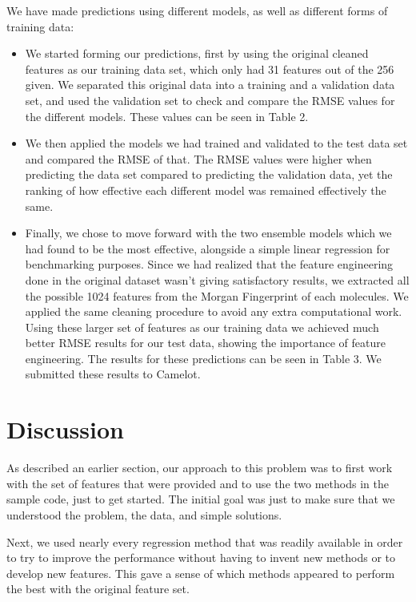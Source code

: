 \documentclass[11pt]{article}
\begin{document}
We have made predictions using different models, as well as different forms of training data: 

  \begin{itemize}

\item We started forming our predictions, first by using the original cleaned features as our training data set, which only had 31 features out of the 256 given. We separated this original data into a training and a validation data set, and used the validation set to check and compare the RMSE values for the different models. These values can be seen in Table 2. 

\item We then applied the models we had trained and validated to the test data set and compared the RMSE of that. The RMSE values were higher when predicting the data set compared to predicting the validation data, yet the ranking of how effective each different model was remained effectively the same. 

\item Finally, we chose to move forward with the two ensemble models which we had found to be the most effective, alongside a simple linear regression for benchmarking purposes. Since we had realized that the feature engineering done in the original dataset wasn't giving satisfactory results, we extracted all the possible 1024 features from the Morgan Fingerprint of each molecules. We applied the same cleaning procedure to avoid any extra computational work. Using these larger set of features as our training data we achieved much better RMSE results for our test data, showing the importance of feature engineering. The results for these predictions can be seen in Table 3.   We submitted these results to Camelot.

\end{itemize}

\section{Discussion} 

As described an earlier section, our approach to this problem was to first work with the set of features that were provided and to use the two methods in the sample code, just to get started.  The initial goal was just to make sure that we understood the problem, the data, and simple solutions.  

Next, we used nearly every regression method that was readily available in order to try to improve the performance without having to invent new methods or to develop new features.  This gave a sense of which methods appeared to perform the best with the original feature set.
\end{document}
